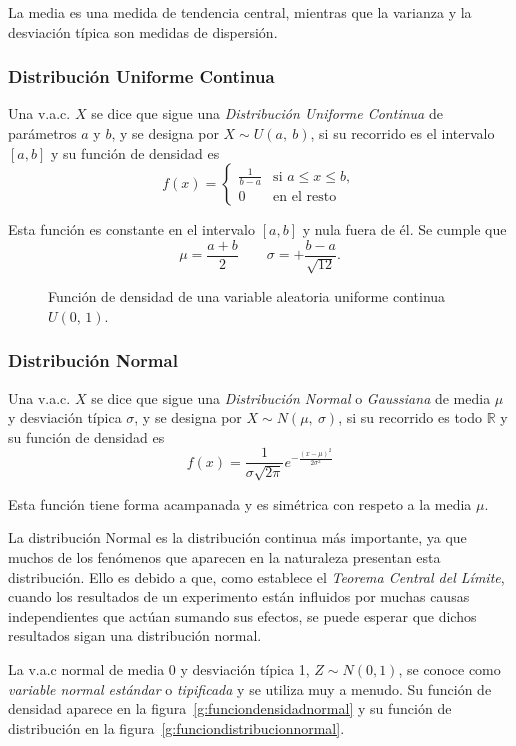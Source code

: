 La media es una medida de tendencia central, mientras que la varianza y la desviación típica son medidas de dispersión.


\subsubsection{Distribución Uniforme Continua}
Una v.a.c. $X$ se dice que sigue una \emph{Distribución Uniforme Continua} de parámetros $a$ y $b$, y
se designa por $X\sim U(a,\ b)$, si su recorrido es el intervalo $[a,b]$ y su función de densidad es 
\[ 
f(x) = 
\begin{cases}
\frac{1}{b-a} & \mbox{si $a\leq x\leq b$},\\
0 & \mbox{en el resto}
\end{cases}
\]

Esta función es constante en el intervalo $[a,b]$ y nula fuera de él. Se cumple que
\[
\mu=\frac{a+b}{2} \qquad \sigma=+\frac{b-a}{\sqrt{12}}.
\]

\begin{figure}[h!]
\centering
\scalebox{0.8}{} 
\caption{Función de densidad de una variable aleatoria uniforme continua $U(0,\,1)$.}
\label{g:uniforme}
\end{figure}


\subsubsection{Distribución Normal}

Una v.a.c. $X$ se dice que sigue una \emph{Distribución Normal} o \emph{Gaussiana} de media $\mu$ y desviación típica $\sigma$, y se designa
por $X\sim N(\mu,\ \sigma)$, si su recorrido es todo $\mathbb{R}$ y su función de densidad es 
\[
f(x) = \frac{1}{{\sigma \sqrt {2\pi } }}e^{- \frac{{(x - \mu )^2 }}{{2\sigma ^2 }}}
\]

Esta función tiene forma acampanada y es simétrica con respeto a la media $\mu$.

La distribución Normal es la distribución continua más importante, ya que muchos de los fenómenos que aparecen en la naturaleza presentan
esta distribución. Ello es debido a que, como establece el \emph{Teorema Central del Límite}, cuando los resultados de un experimento están
influidos por muchas causas independientes que actúan sumando sus efectos, se puede esperar que dichos resultados sigan una distribución
normal.

La v.a.c normal de media 0 y desviación típica 1, $Z\sim N(0,1)$, se conoce como \emph{variable normal estándar} o \emph{tipificada} y se
utiliza muy a menudo. Su función de densidad aparece en la figura~\ref{g:funciondensidadnormal} y su función de distribución en la
figura~\ref{g:funciondistribucionnormal}.

